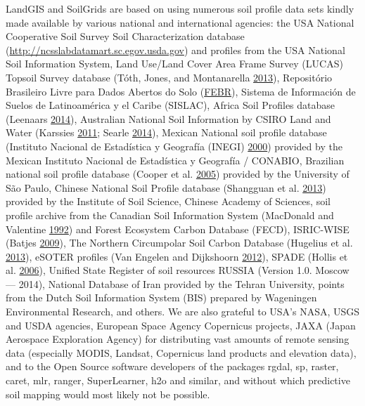 \documentclass[graybox,natbib,nospthms]{svmono}
\begin{document}
LandGIS and SoilGrids are based on using numerous soil profile data sets
kindly made available by various national and international agencies:
the USA National Cooperative Soil Survey Soil Characterization database
(\url{http://ncsslabdatamart.sc.egov.usda.gov}) and profiles from the
USA National Soil Information System, Land Use/Land Cover Area Frame
Survey (LUCAS) Topsoil Survey database (Tóth, Jones, and Montanarella
\protect\hyperlink{ref-Toth2013LUCAS}{2013}), Repositório Brasileiro
Livre para Dados Abertos do Solo
(\href{https://github.com/febr-team}{FEBR}), Sistema de Información de
Suelos de Latinoamérica y el Caribe (SISLAC), Africa Soil Profiles
database (Leenaars \protect\hyperlink{ref-Leenaars2012}{2014}),
Australian National Soil Information by CSIRO Land and Water (Karssies
\protect\hyperlink{ref-Karssies2011CSIRO}{2011}; Searle
\protect\hyperlink{ref-searle2014australian}{2014}), Mexican National
soil profile database (Instituto Nacional de Estadística y Geografía
(INEGI) \protect\hyperlink{ref-INEGI2000}{2000}) provided by the Mexican
Instituto Nacional de Estadística y Geografía / CONABIO, Brazilian
national soil profile database (Cooper et al.
\protect\hyperlink{ref-cooper2005national}{2005}) provided by the
University of São Paulo, Chinese National Soil Profile database
(Shangguan et al. \protect\hyperlink{ref-shangguan2013china}{2013})
provided by the Institute of Soil Science, Chinese Academy of Sciences,
soil profile archive from the Canadian Soil Information System
(MacDonald and Valentine
\protect\hyperlink{ref-macdonald1992cansis}{1992}) and Forest Ecosystem
Carbon Database (FECD), ISRIC-WISE (Batjes
\protect\hyperlink{ref-Batjes2009SUM}{2009}), The Northern Circumpolar
Soil Carbon Database (Hugelius et al.
\protect\hyperlink{ref-essd-5-3-2013}{2013}), eSOTER profiles (Van
Engelen and Dijkshoorn \protect\hyperlink{ref-VanEngelen2012}{2012}),
SPADE (Hollis et al. \protect\hyperlink{ref-hollis2006spade}{2006}),
Unified State Register of soil resources RUSSIA (Version 1.0. Moscow ---
2014), National Database of Iran provided by the Tehran University,
points from the Dutch Soil Information System (BIS) prepared by
Wageningen Environmental Research, and others. We are also grateful to
USA's NASA, USGS and USDA agencies, European Space Agency Copernicus
projects, JAXA (Japan Aerospace Exploration Agency) for distributing
vast amounts of remote sensing data (especially MODIS, Landsat,
Copernicus land products and elevation data), and to the Open Source
software developers of the packages rgdal, sp, raster, caret, mlr,
ranger, SuperLearner, h2o and similar, and without which predictive soil
mapping would most likely not be possible.
\end{document}
